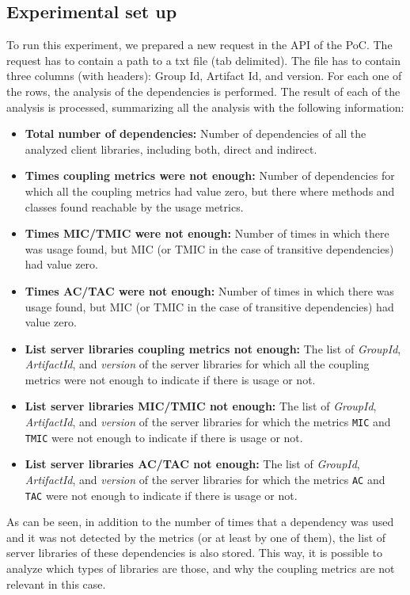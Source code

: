 \subsection{Experimental set up}
To run this experiment, we prepared a new request in the API of the PoC. The request has to contain a path to a txt file (tab delimited). The file has to contain three columns (with headers): Group Id, Artifact Id, and version. For each one of the rows, the analysis of the dependencies is performed. The result of each of the analysis is processed, summarizing all the analysis with the following information:

\begin{itemize}
  \item \textbf{Total number of dependencies:} Number of dependencies of all the analyzed client libraries, including both, direct and indirect.
  \item \textbf{Times coupling metrics were not enough:} Number of dependencies for which all the coupling metrics had value zero, but there where methods and classes found reachable by the usage metrics.
  \item \textbf{Times MIC/TMIC were not enough:} Number of times in which there was usage found, but MIC (or TMIC in the case of transitive dependencies) had value zero.
  \item \textbf{Times AC/TAC were not enough:} Number of times in which there was usage found, but MIC (or TMIC in the case of transitive dependencies) had value zero.
  \item \textbf{List server libraries coupling metrics not enough:} The list of \textit{GroupId}, \textit{ArtifactId}, and \textit{version} of the server libraries for which all the coupling metrics were not enough to indicate if there is usage or not.
  \item \textbf{List server libraries MIC/TMIC not enough:} The list of \textit{GroupId}, \textit{ArtifactId}, and \textit{version} of the server libraries for which the metrics \texttt{MIC} and \texttt{TMIC} were not enough to indicate if there is usage or not.
  \item \textbf{List server libraries AC/TAC not enough:} The list of \textit{GroupId}, \textit{ArtifactId}, and \textit{version} of the server libraries for which the metrics \texttt{AC} and \texttt{TAC} were not enough to indicate if there is usage or not.
\end{itemize}

As can be seen, in addition to the number of times that a dependency was used and it was not detected by the metrics (or at least by one of them), the list of server libraries of these dependencies is also stored. This way, it is possible to analyze which types of libraries are those, and why the coupling metrics are not relevant in this case.

